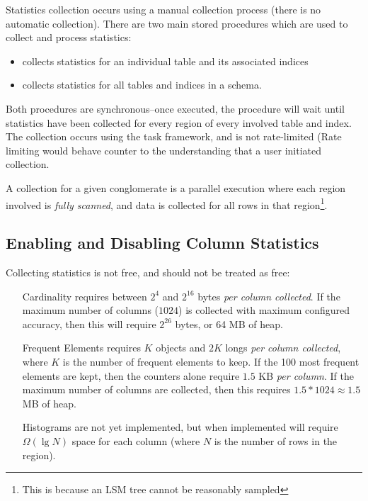 Statistics collection occurs using a manual collection process (there is no automatic collection). There are two main stored procedures which are used to collect and process statistics:

\begin{itemize}
\item \collecttablestats collects statistics for an individual table and its associated indices
\item \collectschemastats collects statistics for all tables and indices in a schema.
\end{itemize}

Both procedures are synchronous--once executed, the procedure will wait until statistics have been collected for every region of every involved table and index. The collection occurs using the task framework, and is not rate-limited (Rate limiting would behave counter to the understanding that a user initiated collection.

A collection for a given conglomerate is a parallel execution where each region involved is \emph{fully scanned}, and data is collected for all rows in that region\footnote{This is because an LSM tree cannot be reasonably sampled}. 

\subsection{Enabling and Disabling Column Statistics}
Collecting statistics is not free, and should not be treated as free:

\begin{enumerate}
\item[Cardinality] requires between $2^{4}$ and $2^{16}$ bytes \emph{per column collected}. If the maximum number of columns ($1024$) is collected with maximum configured accuracy, then this will require $2^{26}$ bytes, or 64 MB of heap.
\item[Frequent Elements] requires $K$ objects and $2K$ longs \emph{per column collected}, where $K$ is the number of frequent elements to keep. If the 100 most frequent elements are kept, then the counters alone require $1.5$ KB \emph{per column}. If the maximum number of columns are collected, then this requires $1.5*1024 \approx 1.5$ MB of heap.
\item[Histograms] are not yet implemented, but when implemented will require $\Omega(\lg{N})$ space for each column (where $N$ is the number of rows in the region).
\end{enumerate}

